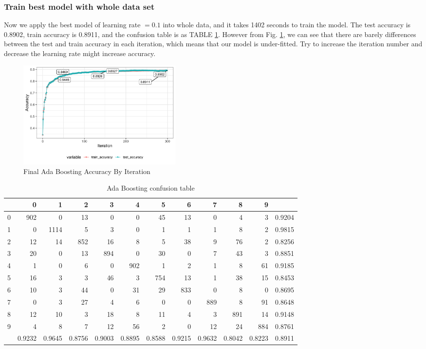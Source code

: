 \documentclass[conference]{IEEEtran}
\begin{document}
\subsubsection{Train best model with whole data set}
Now we apply the best model of learning rate $=0.1$ into whole data, and it takes 1402 seconds to  train the model. The test accuracy is 0.8902, train accuracy is 0.8911, and the confusion table is as TABLE \ref{tab:Ada Boosting confusion table}. However from Fig. \ref{Final Ada Boosting Accuracy By Iteration}, we can see that there are barely differences between the test and train accuracy in each iteration, which means that our model is under-fitted. Try to increase the iteration number and decrease the learning rate might increase accuracy.
\begin{figure}[htbp]
\centerline{\includegraphics[width=0.4\textwidth]{figure/Final Ada Boosting Accuracy By Iteration.png}}
\caption{Final Ada Boosting Accuracy By Iteration}
\label{Final Ada Boosting Accuracy By Iteration}
\end{figure}
\begin{table}[htbp]
\tiny
  \centering
  \caption{Ada Boosting confusion table}
\begin{tabular}{|r|rrrrrrrrrr|r|}
\hline
  & 0 & 1 & 2 & 3 & 4 & 5 & 6 & 7 & 8 & 9 &  \\
\hline
0 & 902 & 0 & 13 & 0 & 0 & 45 & 13 & 0 & 4 & 3 & 0.9204 \\
1 & 0 & 1114 & 5 & 3 & 0 & 1 & 1 & 1 & 8 & 2 & 0.9815 \\
2 & 12 & 14 & 852 & 16 & 8 & 5 & 38 & 9 & 76 & 2 & 0.8256 \\
3 & 20 & 0 & 13 & 894 & 0 & 30 & 0 & 7 & 43 & 3 & 0.8851 \\
4 & 1 & 0 & 6 & 0 & 902 & 1 & 2 & 1 & 8 & 61 & 0.9185 \\
5 & 16 & 3 & 3 & 46 & 3 & 754 & 13 & 1 & 38 & 15 & 0.8453 \\
6 & 10 & 3 & 44 & 0 & 31 & 29 & 833 & 0 & 8 & 0 & 0.8695 \\
7 & 0 & 3 & 27 & 4 & 6 & 0 & 0 & 889 & 8 & 91 & 0.8648 \\
8 & 12 & 10 & 3 & 18 & 8 & 11 & 4 & 3 & 891 & 14 & 0.9148 \\
9 & 4 & 8 & 7 & 12 & 56 & 2 & 0 & 12 & 24 & 884 & 0.8761 \\
\hline
  & 0.9232 & 0.9645 & 0.8756 & 0.9003 & 0.8895 & 0.8588 & 0.9215 & 0.9632 & 0.8042 & 0.8223 & 0.8911 \\
\hline
\end{tabular}%
 \label{tab:Ada Boosting confusion table}%
\end{table}%
\end{document}

